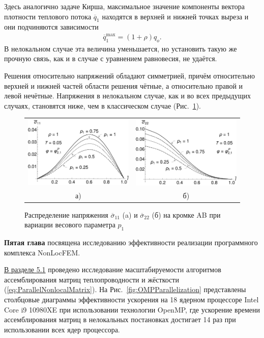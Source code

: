 Здесь аналогично задаче Кирша, максимальное значение компоненты вектора плотности теплового потока $\overline{q}_1$ находятся в верхней и нижней точках выреза и они подчиняются зависимости
\begin{gather*}
	\overline{q}_1^{\max} = (1 + \rho) q_o.
\end{gather*}
В нелокальном случае эта величина уменьшается, но установить такую же прочную связь, как и в случае с уравнением равновесия, не удаётся.

Решения относительно напряжений обладают симметрией, причём относительно верхней и нижней частей области решения чётные, а относительно правой и левой нечётные. Напряжения в нелокальном случае, как и во всех предыдущих случаях, становятся ниже, чем в классическом случае (Рис.~\ref{fig:ThermalKirshP1Variation}).

\begin{figure}[ht] \centering
	\begin{tabular}{cc}
		\includegraphics[width=0.4\linewidth]{pics/ThermalKirshSigma11VariationP1.pdf} &
		\includegraphics[width=0.4\linewidth]{pics/ThermalKirshSigma22VariationP1.pdf} \\
		а) & б)
	\end{tabular}
    \caption{Распределение напряжения $\overline{\sigma}_{11}$ (a) и $\overline{\sigma}_{22}$ (б) на кромке AB при вариации весового параметра $p_1$}
    \label{fig:ThermalKirshP1Variation}
\end{figure}

\textbf{Пятая глава} посвящена исследованию эффективности реализации программного комплекса NonLocFEM.

\underline{В разделе 5.1} проведено исследование масштабируемости алгоритмов ассемблирования матриц теплопроводности и жёсткости (\ref{eq:ParallelNonlocalMatrix}). На Рис.~\ref{fig:OMPParallelization} представлены столбцовые диаграммы эффективности ускорения на 18 ядерном процессоре Intel Core i9
10980XE при использовании технологии OpenMP, где ускорение времени ассемблирования матриц в нелокальных постановках достигает 14 раз при использовании всех ядер процессора.

